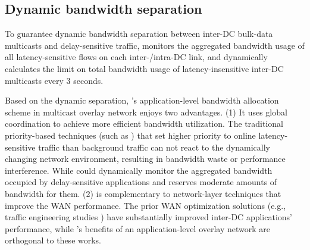 \subsection{Dynamic bandwidth separation}
\label{subsec:system:separation}


To guarantee dynamic bandwidth separation between inter-DC
bulk-data multicasts and delay-sensitive traffic, \name
monitors the aggregated bandwidth usage of all
latency-sensitive flows on each inter-/intra-DC link, and dynamically
calculates the limit on total bandwidth usage of
latency-insensitive inter-DC multicasts every 3 seconds.



Based on the dynamic separation, \name's application-level bandwidth allocation scheme in multicast overlay network enjoys two advantages. (1) It uses global coordination to achieve more efficient bandwidth utilization. The traditional priority-based techniques (such as \cite{kumar2015bwe}) that set higher priority to online latency-sensitive traffic than background traffic can not react to the dynamically changing network environment, resulting in bandwidth waste or performance interference. While \name could dynamically monitor the aggregated bandwidth occupied by delay-sensitive applications and reserves moderate amounts of bandwidth for them.
(2) \name is complementary to network-layer techniques that improve the WAN performance. The prior WAN optimization solutions (e.g., traffic engineering studies \cite{chen2012design, kavulya2010analysis, mishra2010towards, reiss2012heterogeneity}) have substantially improved inter-DC applications' performance, while \name's benefits of an application-level overlay network are orthogonal to these works.

